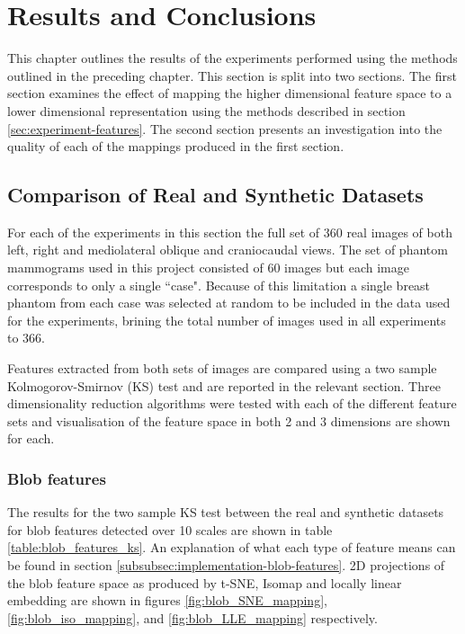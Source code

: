 \chapter{Results and Conclusions}
\label{chap:results}

This chapter outlines the results of the experiments performed using the methods outlined in the preceding chapter. This section is split into two sections. The first section examines the effect of mapping the higher dimensional feature space to a lower dimensional representation using the methods described in section \ref{sec:experiment-features}. The second section presents an investigation into the quality of each of the mappings produced in the first section.

\section{Comparison of Real and Synthetic Datasets}

For each of the experiments in this section the full set of 360 real images of both left, right and mediolateral oblique and craniocaudal views. The set of phantom mammograms used in this project consisted of 60 images but each image corresponds to only a single ``case". Because of this limitation a single breast phantom from each case was selected at random to be included in the data used for the experiments, brining the total number of images used in all experiments to 366.

Features extracted from both sets of images are compared using a two sample Kolmogorov-Smirnov (KS) test and are reported in the relevant section. Three dimensionality reduction algorithms were tested with each of the different feature sets and visualisation of the feature space in both 2 and 3 dimensions are shown for each.

\subsection{Blob features} 
The results for the two sample KS test between the real and synthetic datasets for blob features detected over 10 scales are shown in table \ref{table:blob_features_ks}. An explanation of what each type of feature means can be found in section \ref{subsubsec:implementation-blob-features}. 2D projections of the blob feature space as produced by t-SNE, Isomap and locally linear embedding are shown in figures \ref{fig:blob_SNE_mapping}, \ref{fig:blob_iso_mapping}, and \ref{fig:blob_LLE_mapping} respectively. 

